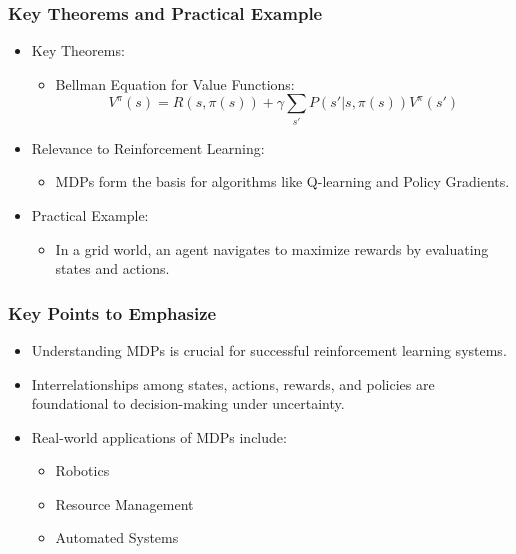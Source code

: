 \documentclass[aspectratio=169]{beamer}
\begin{document}
\begin{frame}[fragile]
  \frametitle{Key Theorems and Practical Example}
  
  \begin{itemize}
      \item Key Theorems:
      \begin{itemize}
          \item Bellman Equation for Value Functions:
          \begin{equation}
          V^\pi(s) = R(s, \pi(s)) + \gamma \sum_{s'} P(s'|s, \pi(s)) V^\pi(s')
          \end{equation}
      \end{itemize}
      
      \item Relevance to Reinforcement Learning:
      \begin{itemize}
          \item MDPs form the basis for algorithms like Q-learning and Policy Gradients.
      \end{itemize}
      
      \item Practical Example:
      \begin{itemize}
          \item In a grid world, an agent navigates to maximize rewards by evaluating states and actions.
      \end{itemize}
  \end{itemize}
\end{frame}

\begin{frame}[fragile]
  \frametitle{Key Points to Emphasize}
  
  \begin{itemize}
      \item Understanding MDPs is crucial for successful reinforcement learning systems.
      \item Interrelationships among states, actions, rewards, and policies are foundational to decision-making under uncertainty.
      \item Real-world applications of MDPs include:
      \begin{itemize}
          \item Robotics
          \item Resource Management
          \item Automated Systems
      \end{itemize}
  \end{itemize}
\end{frame}
\end{document}
